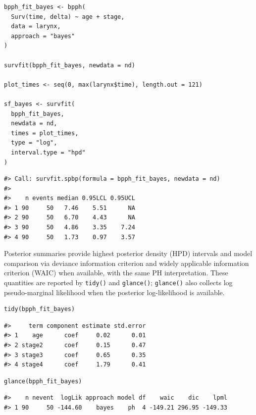 \documentclass[5p,lefttitle]{elsarticle}
\begin{document}
{{\begin{verbatim}
bpph_fit_bayes <- bpph(
  Surv(time, delta) ~ age + stage,
  data = larynx,
  approach = "bayes"
)

survfit(bpph_fit_bayes, newdata = nd)

plot_times <- seq(0, max(larynx$time), length.out = 121)

sf_bayes <- survfit(
  bpph_fit_bayes,
  newdata = nd,
  times = plot_times,
  type = "log",
  interval.type = "hpd"
)
\end{verbatim}}

{\footnotesize\begin{verbatim}
#> Call: survfit.spbp(formula = bpph_fit_bayes, newdata = nd)
#>
#>    n events median 0.95LCL 0.95UCL
#> 1 90     50   7.46    5.51      NA
#> 2 90     50   6.70    4.43      NA
#> 3 90     50   4.86    3.35    7.24
#> 4 90     50   1.73    0.97    3.57
\end{verbatim}}


Posterior summaries provide highest posterior density (HPD) intervals
and model comparison via deviance information criterion
\citep{spiegelhalter2002bayesian} and widely applicable information
criterion (WAIC) \citep{Vehtari:2017, watanabe2013widely} when available,
with the same PH interpretation. These quantities are reported by
\texttt{tidy()} and \texttt{glance()}; \texttt{glance()} also collects
log pseudo-marginal likelihood
\citep{geisser1979predictive, ibrahim2001bayesian} when the posterior
log-likelihood is available.

{\footnotesize\begin{verbatim}
tidy(bpph_fit_bayes)
\end{verbatim}}

{\footnotesize\begin{verbatim}
#>     term component estimate std.error
#> 1    age      coef     0.02      0.01
#> 2 stage2      coef     0.15      0.47
#> 3 stage3      coef     0.65      0.35
#> 4 stage4      coef     1.79      0.41
\end{verbatim}}

{\footnotesize\begin{verbatim}
glance(bpph_fit_bayes)
\end{verbatim}}

{\footnotesize\begin{verbatim}
#>    n nevent  logLik approach model df    waic    dic    lpml
#> 1 90     50 -144.60    bayes    ph  4 -149.21 296.95 -149.33
\end{verbatim}}

}
\end{document}
